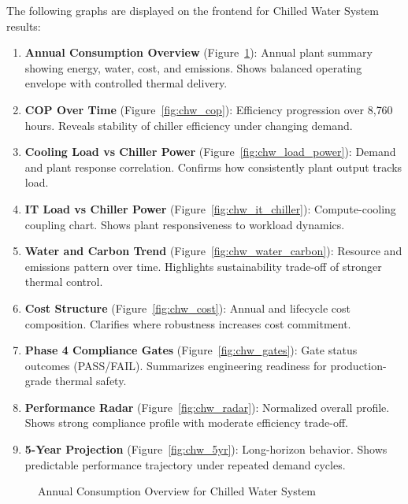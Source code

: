 \documentclass[12pt,a4paper]{report}
\begin{document}
The following graphs are displayed on the frontend for Chilled Water System results:

\begin{enumerate}[noitemsep]
  \item \textbf{Annual Consumption Overview} (Figure~\ref{fig:chw_overview}): Annual plant summary showing energy, water, cost, and emissions. Shows balanced operating envelope with controlled thermal delivery.
  
  \item \textbf{COP Over Time} (Figure~\ref{fig:chw_cop}): Efficiency progression over 8{,}760 hours. Reveals stability of chiller efficiency under changing demand.
  
  \item \textbf{Cooling Load vs Chiller Power} (Figure~\ref{fig:chw_load_power}): Demand and plant response correlation. Confirms how consistently plant output tracks load.
  
  \item \textbf{IT Load vs Chiller Power} (Figure~\ref{fig:chw_it_chiller}): Compute-cooling coupling chart. Shows plant responsiveness to workload dynamics.
  
  \item \textbf{Water and Carbon Trend} (Figure~\ref{fig:chw_water_carbon}): Resource and emissions pattern over time. Highlights sustainability trade-off of stronger thermal control.
  
  \item \textbf{Cost Structure} (Figure~\ref{fig:chw_cost}): Annual and lifecycle cost composition. Clarifies where robustness increases cost commitment.
  
  \item \textbf{Phase 4 Compliance Gates} (Figure~\ref{fig:chw_gates}): Gate status outcomes (PASS/FAIL). Summarizes engineering readiness for production-grade thermal safety.
  
  \item \textbf{Performance Radar} (Figure~\ref{fig:chw_radar}): Normalized overall profile. Shows strong compliance profile with moderate efficiency trade-off.
  
  \item \textbf{5-Year Projection} (Figure~\ref{fig:chw_5yr}): Long-horizon behavior. Shows predictable performance trajectory under repeated demand cycles.
\end{enumerate}

\begin{figure}[H]
\centering
{}
\caption{Annual Consumption Overview for Chilled Water System}
\label{fig:chw_overview}
\end{figure}
\end{document}
